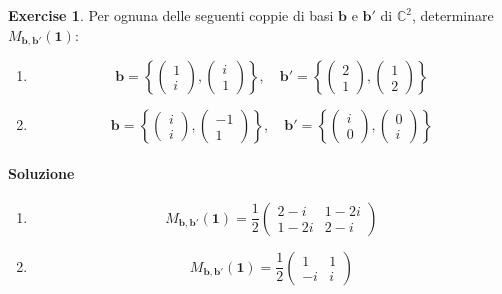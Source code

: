 \documentclass{article}
\theoremstyle{plain}
\theoremstyle{definition}
\newtheorem{xca}[exmp]{Exercise}
\theoremstyle{remark}
\begin{document}
\begin{bxthm}
\begin{xca}
Per ognuna delle seguenti coppie di basi \( \mathbf{b} \) e \( \mathbf{b}' \) di \( \mathbb{C}^2 \), determinare \( M_{\mathbf{b},\mathbf{b}'}(\mathbf{1}) \):
\begin{enumerate}
    \item \[ \mathbf{b} = \left\{\begin{pmatrix}1\\ i\end{pmatrix}, \begin{pmatrix}i \\ 1 \end{pmatrix}\right\}, \quad  \mathbf{b}' = \left\{\begin{pmatrix}2\\ 1\end{pmatrix}, \begin{pmatrix}1\\ 2\end{pmatrix} \right\} \]
    \item \[ \mathbf{b} = \left\{\begin{pmatrix}i\\ i\end{pmatrix}, \begin{pmatrix}-1\\ 1\end{pmatrix} \right\}, \quad \mathbf{b}' =   \left\{\begin{pmatrix}i\\ 0\end{pmatrix}, \begin{pmatrix}0\\ i\end{pmatrix}\right\} \]
\end{enumerate}
\end{xca}
\end{bxthm}
\paragraph{Soluzione}
\begin{enumerate}
    \item \[M_{\mathbf{b},\mathbf{b}'}(\mathbf{1})=\frac{1}{2}
    \begin{pmatrix}
         2-i&1-2i \\
         1-2i&2-i
    \end{pmatrix} 
    \]
    \item \[M_{\mathbf{b},\mathbf{b}'}(\mathbf{1})=\frac{1}{2}
    \begin{pmatrix}
         1&1 \\
         -i&i
    \end{pmatrix} 
    \]
\end{enumerate}
\end{document}
